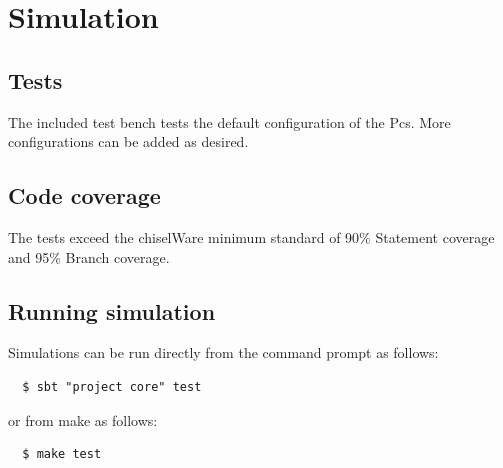 \section{Simulation}

\subsection{Tests}
The included test bench tests the default configuration of the Pcs. More configurations can be added as desired.

\subsection{Code coverage}

The tests exceed the chiselWare minimum standard of 90\% Statement coverage
and 95\% Branch coverage.

\subsection{Running simulation}

Simulations can be run directly from the command prompt as follows:

\begin{verbatim}
  $ sbt "project core" test
\end{verbatim}

or from make as follows:

\begin{verbatim}
  $ make test
\end{verbatim}